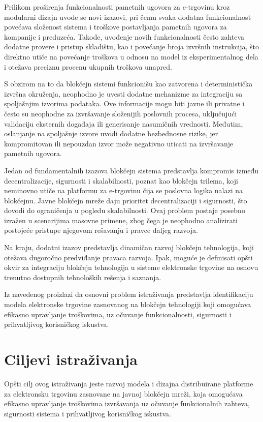 Prilikom proširenja funkcionalnosti pametnih ugovora za e-trgovinu kroz modularni dizajn uvode se novi izazovi, pri čemu svaka dodatna funkcionalnost povećava složenost sistema i troškove postavljanja pametnih ugovora za kompanije i preduzeća. Takođe, uvođenje novih funkcionalnosti često zahteva dodatne provere i pristup skladištu, kao i povećanje broja izvršnih instrukcija, što direktno utiče na povećanje troškova u odnosu na model iz eksperimentalnog dela i otežava preciznu procenu ukupnih troškova unapred.

S obzirom na to da blokčejn sistemi funkcionišu kao zatvorena i deterministička izvršna okruženja, neophodno je uvesti dodatne mehanizme za integraciju sa spoljašnjim izvorima podataka. Ove informacije mogu biti javne ili privatne i često su neophodne za izvršavanje složenijih poslovnih procesa, uključujući validaciju eksternih događaja ili generisanje nasumičnih vrednosti. Međutim, oslanjanje na spoljašnje izvore uvodi dodatne bezbednosne rizike, jer kompromitovan ili nepouzdan izvor može negativno uticati na izvršavanje pametnih ugovora.

Jedan od fundamentalnih izazova blokčejn sistema predstavlja kompromis između decentralizacije, sigurnosti i skalabilnosti, poznat kao blokčejn trilema, koji neminovno utiče na platformu za e-trgovinu čija se poslovna logika nalazi na blokčejnu. Javne blokčejn mreže daju prioritet decentralizaciji i sigurnosti, što dovodi do ograničenja u pogledu skalabilnosti. Ovaj problem postaje posebno izražen u scenarijima masovne primene, zbog čega je neophodno analizirati postojeće pristupe njegovom rešavanju i pravce daljeg razvoja.

Na kraju, dodatni izazov predstavlja dinamičan razvoj blokčejn tehnologija, koji otežava dugoročno predviđanje pravaca razvoja. Ipak, moguće je definisati opšti okvir za integraciju blokčejn tehnologija u sisteme elektronske trgovine na osnovu trenutno dostupnih tehnoloških rešenja i saznanja.

Iz navedenog proizlazi da osnovni problem istraživanja predstavlja identifikaciju modela elektronske trgovine zasnovanog na blokčejn tehnologiji koji omogućava efikasno upravljanje troškovima, uz očuvanje funkcionalnosti, sigurnosti i prihvatljivog korisničkog iskustva.

\section{Ciljevi istraživanja}
Opšti cilj ovog istraživanja jeste razvoj modela i dizajna distribuirane platforme za elektronsku trgovinu zasnovane na javnoj blokčejn mreži, koja omogućava efikasno upravljanje troškovima izvršavanja uz očuvanje funkcionalnih zahteva, sigurnosti sistema i prihvatljivog korisničkog iskustva.

